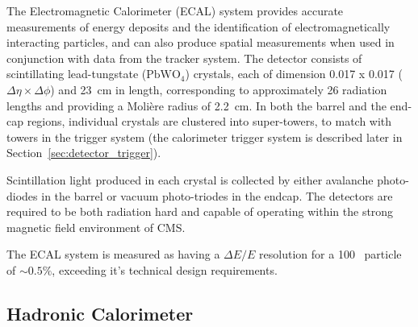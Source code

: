 

The Electromagnetic Calorimeter (ECAL) system provides accurate measurements of 
energy deposits and the identification of electromagnetically interacting 
particles, and can also produce spatial measurements when used in conjunction 
with data from the tracker system. The detector consists of scintillating
lead-tungstate
($\text{PbWO}_4$) crystals, each of dimension 0.017 x 0.017 ($\Delta \eta \times
\Delta \phi$) and 23~cm in length, corresponding to approximately 26 radiation
lengths
and providing a Moli\`{e}re radius of 2.2~cm. In both the barrel and the
end-cap regions, individual crystals are clustered into super-towers, to match
with towers in the trigger system (the calorimeter trigger system is described
later in Section~\ref{sec:detector_trigger}).

Scintillation light produced in each crystal is collected by either
avalanche photo-diodes in the barrel or vacuum photo-triodes in the
endcap. The detectors are required to be both radiation hard and capable of
operating within the strong magnetic field environment of CMS.

The ECAL system is measured as having a $\Delta E/E$ resolution for a 100~\gev
particle of $\sim 0.5\%$, exceeding it's technical design requirements.

\subsection{Hadronic Calorimeter}


